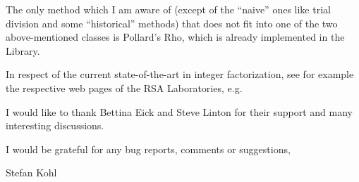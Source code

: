 The only method which I am aware of (except of the ``naive'' ones like
trial division and some ``historical'' methods) 
that does not fit into one of the two above-mentioned
classes is 
Pollard's Rho, 
which is already implemented in the {\GAP}  Library.

In respect of the current state-of-the-art in integer factorization,
see for example the respective web pages of the 
RSA Laboratories, e.g. 

I would like to thank Bettina Eick and Steve Linton for their support
and many interesting discussions.

I would be grateful for any bug reports, comments or suggestions,

\vfill%

\hfill                 Stefan Kohl

